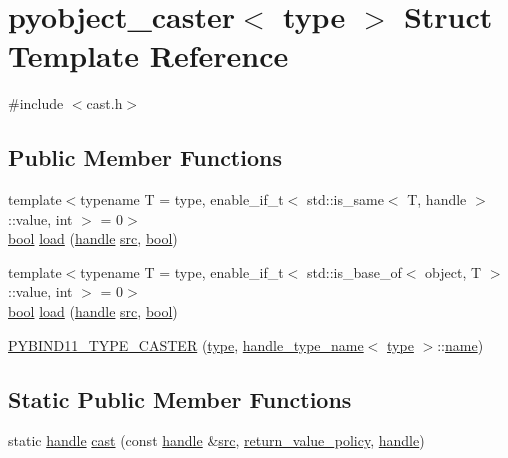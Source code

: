 \hypertarget{structpyobject__caster}{}\section{pyobject\+\_\+caster$<$ type $>$ Struct Template Reference}
\label{structpyobject__caster}


{\ttfamily \#include $<$cast.\+h$>$}

\subsection*{Public Member Functions}
\begin{DoxyCompactItemize}
\item 
{\footnotesize template$<$typename T  = type, enable\+\_\+if\+\_\+t$<$ std\+::is\+\_\+same$<$ T, handle $>$\+::value, int $>$  = 0$>$ }\\\mbox{\hyperlink{asdl_8h_af6a258d8f3ee5206d682d799316314b1}{bool}} \mbox{\hyperlink{structpyobject__caster_a68cb5b39f3864f5a6c13bc0b99ad3a3b}{load}} (\mbox{\hyperlink{classhandle}{handle}} \mbox{\hyperlink{_s_d_l__opengl__glext_8h_a72e0fdf0f845ded60b1fada9e9195cd7}{src}}, \mbox{\hyperlink{asdl_8h_af6a258d8f3ee5206d682d799316314b1}{bool}})
\item 
{\footnotesize template$<$typename T  = type, enable\+\_\+if\+\_\+t$<$ std\+::is\+\_\+base\+\_\+of$<$ object, T $>$\+::value, int $>$  = 0$>$ }\\\mbox{\hyperlink{asdl_8h_af6a258d8f3ee5206d682d799316314b1}{bool}} \mbox{\hyperlink{structpyobject__caster_a68cb5b39f3864f5a6c13bc0b99ad3a3b}{load}} (\mbox{\hyperlink{classhandle}{handle}} \mbox{\hyperlink{_s_d_l__opengl__glext_8h_a72e0fdf0f845ded60b1fada9e9195cd7}{src}}, \mbox{\hyperlink{asdl_8h_af6a258d8f3ee5206d682d799316314b1}{bool}})
\item 
\mbox{\hyperlink{structpyobject__caster_a2dcaf6b5349d7059d76995b0dd716579}{P\+Y\+B\+I\+N\+D11\+\_\+\+T\+Y\+P\+E\+\_\+\+C\+A\+S\+T\+ER}} (\mbox{\hyperlink{_s_d_l__opengl_8h_ad5ddf6fca7b585646515660e810e0188}{type}}, \mbox{\hyperlink{structhandle__type__name}{handle\+\_\+type\+\_\+name}}$<$ \mbox{\hyperlink{_s_d_l__opengl_8h_ad5ddf6fca7b585646515660e810e0188}{type}} $>$\+::\mbox{\hyperlink{structname}{name}})
\end{DoxyCompactItemize}
\subsection*{Static Public Member Functions}
\begin{DoxyCompactItemize}
\item 
static \mbox{\hyperlink{classhandle}{handle}} \mbox{\hyperlink{structpyobject__caster_abbc19d02ced2a17c0ddaa8e9b695be31}{cast}} (const \mbox{\hyperlink{classhandle}{handle}} \&\mbox{\hyperlink{_s_d_l__opengl__glext_8h_a72e0fdf0f845ded60b1fada9e9195cd7}{src}}, \mbox{\hyperlink{detail_2common_8h_adde72ab1fb0dd4b48a5232c349a53841}{return\+\_\+value\+\_\+policy}}, \mbox{\hyperlink{classhandle}{handle}})
\end{DoxyCompactItemize}


